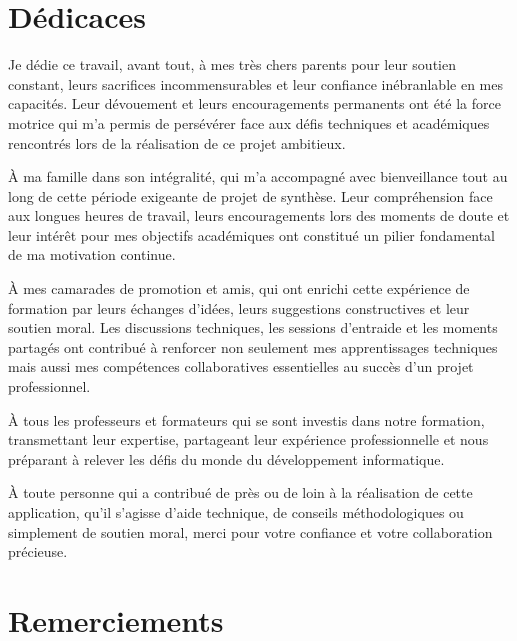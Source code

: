 \documentclass[12pt,a4paper]{report}
\begin{document}
    \cleardoublepage
    \chapter*{Dédicaces}

    Je dédie ce travail, avant tout, à mes très chers parents pour leur soutien constant, leurs sacrifices incommensurables et leur confiance inébranlable en mes capacités. Leur dévouement et leurs encouragements permanents ont été la force motrice qui m'a permis de persévérer face aux défis techniques et académiques rencontrés lors de la réalisation de ce projet ambitieux.
    
    À ma famille dans son intégralité, qui m'a accompagné avec bienveillance tout au long de cette période exigeante de projet de synthèse. Leur compréhension face aux longues heures de travail, leurs encouragements lors des moments de doute et leur intérêt pour mes objectifs académiques ont constitué un pilier fondamental de ma motivation continue.
    
    À mes camarades de promotion et amis, qui ont enrichi cette expérience de formation par leurs échanges d'idées, leurs suggestions constructives et leur soutien moral. Les discussions techniques, les sessions d'entraide et les moments partagés ont contribué à renforcer non seulement mes apprentissages techniques mais aussi mes compétences collaboratives essentielles au succès d'un projet professionnel.
    
    À tous les professeurs et formateurs qui se sont investis dans notre formation, transmettant leur expertise, partageant leur expérience professionnelle et nous préparant à relever les défis du monde du développement informatique.
    
    À toute personne qui a contribué de près ou de loin à la réalisation de cette application, qu'il s'agisse d'aide technique, de conseils méthodologiques ou simplement de soutien moral, merci pour votre confiance et votre collaboration précieuse.


    \clearpage
    \chapter*{Remerciements}
\end{document}
